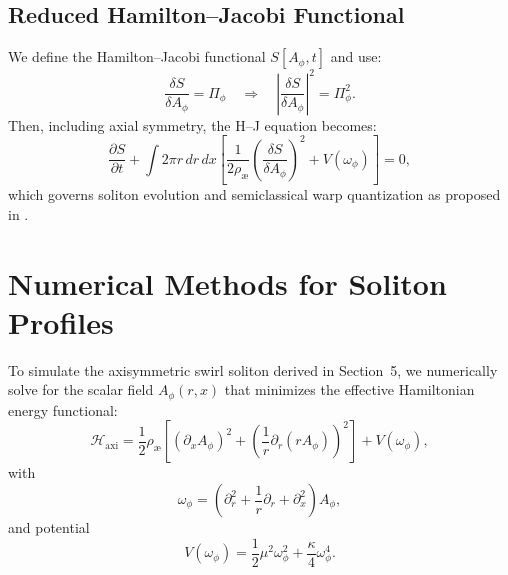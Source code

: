 \documentclass[preprint,notitlepage]{revtex4-2}
\begin{document}
        \subsection*{Reduced Hamilton–Jacobi Functional}
        We define the Hamilton–Jacobi functional $S[A_\phi, t]$ and use:
        \begin{equation}
          \frac{\delta S}{\delta A_\phi} = \Pi_\phi \quad \Rightarrow \quad \left|\frac{\delta S}{\delta A_\phi}\right|^2 = \Pi_\phi^2.
        \end{equation}
        Then, including axial symmetry, the H–J equation becomes:
        \begin{equation}
          \frac{\partial S}{\partial t} + \int 2\pi r \,dr\,dx \left[ \frac{1}{2\rho_{æ}} \left( \frac{\delta S}{\delta A_\phi} \right)^2 + V(\omega_\phi) \right] = 0,
        \end{equation}
        which governs soliton evolution and semiclassical warp quantization as proposed in \cite{VAM-4}.

    \section{Numerical Methods for Soliton Profiles}\label{sec:numerical_methods}

        To simulate the axisymmetric swirl soliton derived in Section~5, we numerically solve for the scalar field $A_\phi(r,x)$ that minimizes the effective Hamiltonian energy functional:
        \begin{equation}
            \mathcal{H}_{\text{axi}} = \frac{1}{2} \rho_{\text{\ae}} \left[ (\partial_x A_\phi)^2 + \left( \frac{1}{r} \partial_r(r A_\phi) \right)^2 \right] + V(\omega_\phi),
        \end{equation}
        with
        \begin{equation}
            \omega_\phi = \left( \partial_r^2 + \frac{1}{r} \partial_r + \partial_x^2 \right) A_\phi,
        \end{equation}
        and potential
        \begin{equation}
            V(\omega_\phi) = \frac{1}{2} \mu^2 \omega_\phi^2 + \frac{\kappa}{4} \omega_\phi^4.
        \end{equation}
\end{document}
